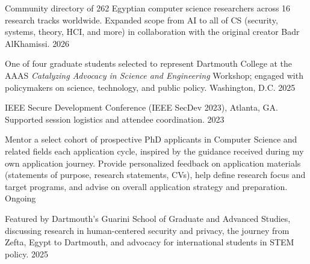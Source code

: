\documentclass[letterpaper,10pt]{article}
\begin{document}

  {Community directory of 262 Egyptian computer science researchers across 16 research tracks worldwide. Expanded scope from AI to all of CS (security, systems, theory, HCI, and more) in collaboration with the original creator Badr AlKhamissi.}
  {2026}

  {One of four graduate students selected to represent Dartmouth College at the AAAS \textit{Catalyzing Advocacy in Science and Engineering} Workshop; engaged with policymakers on science, technology, and public policy. Washington, D.C.}
  {2025}

  {IEEE Secure Development Conference (IEEE SecDev 2023), Atlanta, GA. Supported session logistics and attendee coordination.}
  {2023}

  {Mentor a select cohort of prospective PhD applicants in Computer Science and related fields each application cycle, inspired by the guidance received during my own application journey. Provide personalized feedback on application materials (statements of purpose, research statements, CVs), help define research focus and target programs, and advise on overall application strategy and preparation.}
  {Ongoing}

  {Featured by Dartmouth's Guarini School of Graduate and Advanced Studies, discussing research in human-centered security and privacy, the journey from Zefta, Egypt to Dartmouth, and advocacy for international students in STEM policy.}
  {2025}
\end{document}
